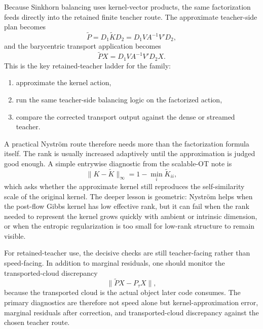 Because Sinkhorn balancing uses kernel-vector products, the same factorization
feeds directly into the retained finite teacher route.  The approximate teacher-side
plan becomes
\begin{equation}
\label{eq:bf-learned-ot-nystrom-plan}
  \widetilde P
  =
  D_1\widetilde K D_2
  =
  D_1 V A^{-1}V' D_2,
\end{equation}
and the barycentric transport application becomes
\begin{equation}
\label{eq:bf-learned-ot-nystrom-transport}
  \widetilde P X
  =
  D_1 V A^{-1}V' D_2 X.
\end{equation}
This is the key retained-teacher ladder for the family:
\begin{enumerate}[label=(\roman*)]
  \item approximate the kernel action,
  \item run the same teacher-side balancing logic on the factorized action,
  \item compare the corrected transport output against the dense or streamed teacher.
\end{enumerate}
A practical Nystr{\"o}m route therefore needs more than the factorization formula
itself.  The rank is usually increased adaptively until the approximation is judged
good enough.  A simple entrywise diagnostic from the scalable-OT note is
\begin{equation}
\label{eq:bf-learned-ot-nystrom-diag-error}
  \|K-\widetilde K\|_\infty
  =
  1-\min_i \widetilde K_{ii},
\end{equation}
which asks whether the approximate kernel still reproduces the self-similarity
scale of the original kernel.  The deeper lesson is geometric: Nystr{\"o}m helps when
the post-flow Gibbs kernel has low effective rank, but it can fail when the rank
needed to represent the kernel grows quickly with ambient or intrinsic dimension,
or when the entropic regularization is too small for low-rank structure to remain
visible.

For retained-teacher use, the decisive checks are still teacher-facing rather than
speed-facing.  In addition to marginal residuals, one should monitor the
transported-cloud discrepancy
\begin{equation}
\label{eq:bf-learned-ot-nystrom-cloud-discrepancy}
  \|\widetilde P X-P_\tau X\|,
\end{equation}
because the transported cloud is the actual object later code consumes.  The
primary diagnostics are therefore not speed alone but kernel-approximation error,
marginal residuals after correction, and transported-cloud discrepancy against the
chosen teacher route.

